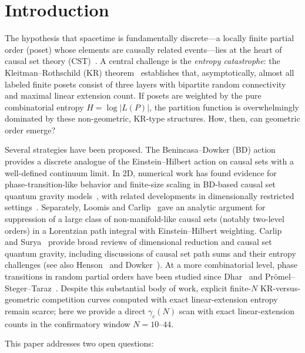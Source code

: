 \documentclass[12pt,a4paper]{article}
\begin{document}
\section{Introduction}
\label{sec:intro}

The hypothesis that spacetime is fundamentally discrete---a locally finite
partial order (poset) whose elements are causally related events---lies at the
heart of causal set theory (CST)~\cite{bombelli1987,sorkin2005}. A central
challenge is the \emph{entropy catastrophe}: the Kleitman--Rothschild (KR)
theorem~\cite{kleitman1975} establishes that, asymptotically, almost all labeled
finite posets consist of three layers with bipartite random connectivity and
maximal linear extension count. If posets are weighted by the pure combinatorial
entropy $H = \log|L(P)|$, the partition function is overwhelmingly dominated by
these non-geometric, KR-type structures. How, then, can geometric order emerge?

Several strategies have been proposed. The Benincasa--Dowker (BD)
action~\cite{benincasa2010,benincasa2011} provides a discrete analogue of the
Einstein--Hilbert action on causal sets with a well-defined continuum limit.
In 2D, numerical work has found evidence for phase-transition-like behavior and
finite-size scaling in BD-based causal set quantum gravity
models~\cite{surya2012,glaser2018}, with related developments in dimensionally
restricted settings~\cite{cunningham2020}. Separately, Loomis and
Carlip~\cite{loomis2018} gave an analytic argument for suppression of a large
class of non-manifold-like causal sets (notably two-level orders) in a
Lorentzian path integral with Einstein--Hilbert weighting. Carlip~\cite{carlip2017}
and Surya~\cite{surya2019} provide broad reviews of dimensional reduction and
causal set quantum gravity, including discussions of causal set path sums and
their entropy challenges (see also Henson~\cite{henson2006} and
Dowker~\cite{dowker2005}). At a more combinatorial level, phase transitions in
random partial orders have been studied since Dhar~\cite{dhar1978} and
Pr{\"o}mel--Steger--Taraz~\cite{promel2001}. Despite this substantial body of
work, explicit finite-$N$ KR-versus-geometric competition curves computed with
exact linear-extension entropy remain scarce; here we provide a direct
$\gamma_c(N)$ scan with exact linear-extension counts in the confirmatory window $N=10$--$44$.

This paper addresses two open questions:
\end{document}
